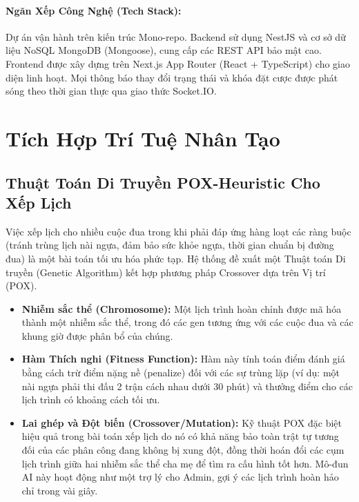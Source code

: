 \documentclass{llncs}
\begin{document}
\paragraph{Ngăn Xếp Công Nghệ (Tech Stack):} Dự án vận hành trên kiến trúc Mono-repo. Backend sử dụng NestJS và cơ sở dữ liệu NoSQL MongoDB (Mongoose), cung cấp các REST API bảo mật cao. Frontend được xây dựng trên Next.js App Router (React + TypeScript) cho giao diện linh hoạt. Mọi thông báo thay đổi trạng thái và khóa đặt cược được phát sóng theo thời gian thực qua giao thức Socket.IO.

\section{Tích Hợp Trí Tuệ Nhân Tạo}

\subsection{Thuật Toán Di Truyền POX-Heuristic Cho Xếp Lịch}
Việc xếp lịch cho nhiều cuộc đua trong khi phải đáp ứng hàng loạt các ràng buộc (tránh trùng lịch nài ngựa, đảm bảo sức khỏe ngựa, thời gian chuẩn bị đường đua) là một bài toán tối ưu hóa phức tạp. Hệ thống đề xuất một Thuật toán Di truyền (Genetic Algorithm) kết hợp phương pháp Crossover dựa trên Vị trí (POX).
\begin{itemize}
    \item \textbf{Nhiễm sắc thể (Chromosome):} Một lịch trình hoàn chỉnh được mã hóa thành một nhiễm sắc thể, trong đó các gen tương ứng với các cuộc đua và các khung giờ được phân bổ của chúng.
    \item \textbf{Hàm Thích nghi (Fitness Function):} Hàm này tính toán điểm đánh giá bằng cách trừ điểm nặng nề (penalize) đối với các sự trùng lặp (ví dụ: một nài ngựa phải thi đấu 2 trận cách nhau dưới 30 phút) và thưởng điểm cho các lịch trình có khoảng cách tối ưu.
    \item \textbf{Lai ghép và Đột biến (Crossover/Mutation):} Kỹ thuật POX đặc biệt hiệu quả trong bài toán xếp lịch do nó có khả năng bảo toàn trật tự tương đối của các phân công đang không bị xung đột, đồng thời hoán đổi các cụm lịch trình giữa hai nhiễm sắc thể cha mẹ để tìm ra cấu hình tốt hơn. Mô-đun AI này hoạt động như một trợ lý cho Admin, gợi ý các lịch trình hoàn hảo chỉ trong vài giây.
\end{itemize}
\end{document}
